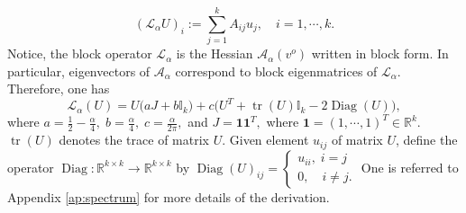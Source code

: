 \documentclass{amsart}%
\begin{document}
\[
(\mathcal L_{\alpha}U)_i:=\sum_{j=1}^kA_{ij}u_j,\quad i=1,\cdots,k.
\]
Notice, the block operator $\mathcal L_{\alpha}$ is the Hessian $\mathcal A_{\alpha}(v^o)$ written in block form. 
In particular, eigenvectors of $\mathcal A_{\alpha}$ correspond to block eigenmatrices of $\mathcal L_{\alpha}$. Therefore, one has 
\begin{equation}\label{eq:specturm}
    \mathcal L_{\alpha}(U)=U\Big(aJ+b\mathbb I_k\Big)+c\Big(U^T+\operatorname{tr}(U)\mathbb I_k-2\operatorname{Diag}(U)\Big),
\end{equation}
where $a=\frac{1}{2}-\frac{\alpha}{4},\; b=\frac{\alpha}{4},\;c=\frac{\alpha}{2\pi},$ and $J=\mathbf{1}\mathbf{1}^T,$  where $\mathbf{1}=(1,\cdots,1)^T\in\mathbb R^k.$ $\operatorname{tr}(U)$ denotes the trace of matrix $U.$ Given element 
$u_{ij}$ of matrix $U$, define the operator $\operatorname{Diag}:\mathbb R^{k\times k} \to \mathbb R^{k\times k}$ by 
 $\operatorname{Diag}(U)_{ij}=\begin{cases}
    u_{ii},\; i=j\\
    0,\quad i\neq j.
\end{cases}$ One is referred to Appendix \eqref{ap:spectrum} for more details of the derivation. \vskip0.3cm
\end{document}
